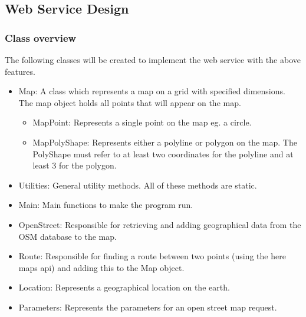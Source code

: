 \documentclass[11pt,twoside,a4paper]{article}
\begin{document}
\subsection{Web Service Design}
\subsubsection{Class overview}

The following classes will be created to implement the web service with
the above features.
\begin{itemize}
\item Map: A class which represents a map on a grid with specified
  dimensions. The map object holds all points that will appear on the
  map.
  \begin{itemize}
  \item MapPoint: Represents a single point on the map eg. a circle.
  \item MapPolyShape: Represents either a polyline or polygon on the
    map. The PolyShape must refer to at least two coordinates for the
    polyline and at least 3 for the polygon.
  \end{itemize}
\item Utilities: General utility methods. All of these methods are
  static.
\item Main: Main functions to make the program run.
\item OpenStreet: Responsible for retrieving and adding geographical
  data from the OSM database to the map.
\item Route: Responsible for finding a route between two points (using
  the here maps api) and adding this to the Map object. 
\item Location: Represents a geographical location on the earth.
\item Parameters: Represents the parameters for an open street map request. 
\end{itemize}
\end{document}
